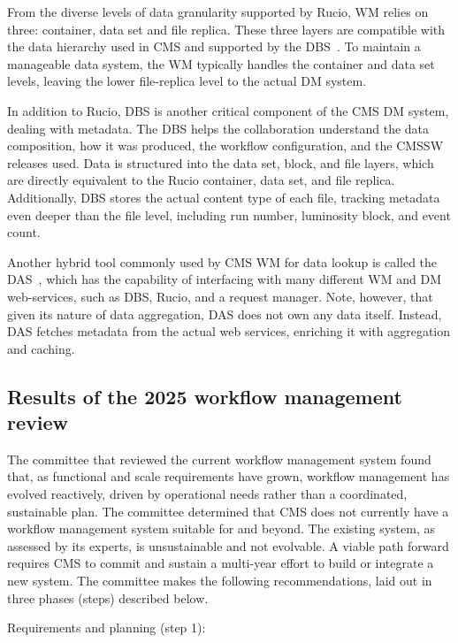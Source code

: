 From the diverse levels of data granularity supported by Rucio, \gls{WM} relies on three: container, data set and file replica. These three layers are compatible with the data hierarchy used in CMS and supported by the \gls{DBS}~\cite{Afaq_2008}. To maintain a manageable data system, the \gls{WM} typically handles the container and data set levels, leaving the lower file-replica level to the actual \gls{DM} system. 

In addition to Rucio, \gls{DBS} is another critical component of the CMS \gls{DM} system, dealing with metadata. The \gls{DBS} helps the collaboration understand the data composition, how it was produced, the workflow configuration, and the \gls{CMSSW} releases used. Data is structured into the data set, block, and file layers, which are directly equivalent to the Rucio container, data set, and file replica. Additionally, \gls{DBS} stores the actual content type of each file, tracking metadata even deeper than the file level, including run number, luminosity block, and event count.

Another hybrid tool commonly used by CMS \gls{WM} for data lookup is called the \gls{DAS}~\cite{KUZNETSOV_2010}, which has the capability of interfacing with many different \gls{WM} and \gls{DM} web-services, such as \gls{DBS}, Rucio, and a request manager. Note, however, that given its nature of data aggregation, \gls{DAS} does not own any data itself. Instead, \gls{DAS} fetches metadata from the actual web services, enriching it with aggregation and caching. 

\subsection{Results of the 2025 workflow management review}

The committee that reviewed the current workflow management system found that, as functional and scale requirements have grown, workflow management has evolved reactively, driven by operational needs rather than a coordinated, sustainable plan. The committee determined that CMS does not currently have a workflow management system suitable for \RunFour and beyond. The existing system, as assessed by its experts, is unsustainable and not evolvable. A viable path forward requires CMS to commit and sustain a multi-year effort to build or integrate a new system. The committee makes the following recommendations, laid out in three phases (steps) described below. 

Requirements and planning (step 1):

